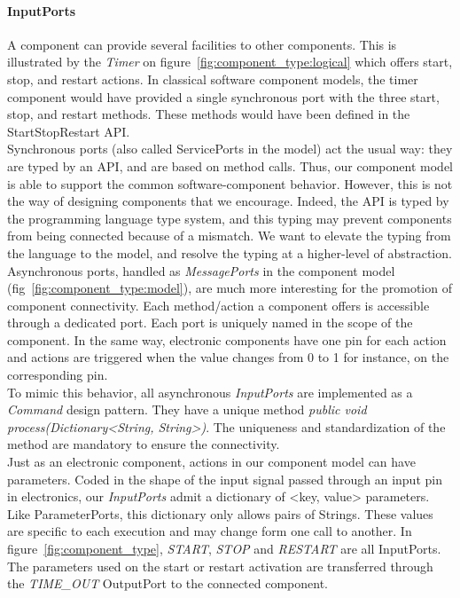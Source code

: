 \paragraph{InputPorts}
A component can provide several facilities to other components. This is illustrated by the \textit{Timer} on figure~\ref{fig:component_type:logical} which offers start, stop, and restart actions. In classical software component models, the timer component would have provided a single synchronous port with the three start, stop, and restart methods. These methods would have been defined in the StartStopRestart API.\\
Synchronous ports (also called ServicePorts in the model) act the usual way: they are typed by an API, and are based on method calls. Thus, our component model is able to support the common software-component behavior. However, this is not the way of designing components that we encourage.
Indeed, the API is typed by the programming language type system, and this typing may prevent components from being connected because of a mismatch. We want to elevate the typing from the language to the model, and resolve the typing at a higher-level of abstraction.\\
Asynchronous ports, handled as \textit{MessagePorts} in the component model (fig~\ref{fig:component_type:model}), are much more interesting for the promotion of component connectivity. Each method/action a component offers is accessible through a dedicated port. Each port is uniquely named in the scope of the component. In the same way, electronic components have one pin for each action and actions are triggered when the value changes from 0 to 1 for instance, on the corresponding pin.\\
To mimic this behavior, all asynchronous {\it InputPorts} are implemented as a {\it Command} design pattern. They have a unique method {\it public void process(Dictionary<String, String>)}. The uniqueness and standardization of the method are mandatory to ensure the connectivity.\\
Just as an electronic component, actions in our component model can have parameters. Coded in the shape of the input signal passed through an input pin in electronics, our \textit{InputPorts} admit a dictionary of <key, value> parameters. Like ParameterPorts, this dictionary only allows pairs of Strings. These values are specific to each execution and may change form one call to another. In figure~\ref{fig:component_type}, \textit{START}, \textit{STOP} and \textit{RESTART} are all InputPorts. The parameters used on the start or restart activation are transferred through the \textit{TIME\_OUT} OutputPort to the connected component.\\

